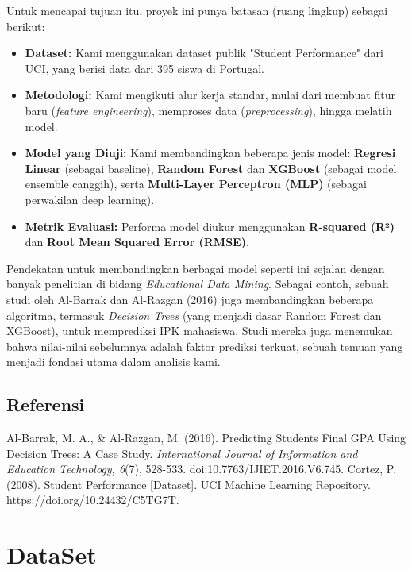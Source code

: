 Untuk mencapai tujuan itu, proyek ini punya batasan (ruang lingkup) sebagai berikut:
\begin{itemize}
    \item \textbf{Dataset:} Kami menggunakan dataset publik "Student Performance" dari UCI, yang berisi data dari 395 siswa di Portugal.
    \item \textbf{Metodologi:} Kami mengikuti alur kerja standar, mulai dari membuat fitur baru (\textit{feature engineering}), memproses data (\textit{preprocessing}), hingga melatih model.
    \item \textbf{Model yang Diuji:} Kami membandingkan beberapa jenis model: \textbf{Regresi Linear} (sebagai baseline), \textbf{Random Forest} dan \textbf{XGBoost} (sebagai model ensemble canggih), serta \textbf{Multi-Layer Perceptron (MLP)} (sebagai perwakilan deep learning).
    \item \textbf{Metrik Evaluasi:} Performa model diukur menggunakan \textbf{R-squared (R²)} dan \textbf{Root Mean Squared Error (RMSE)}.
\end{itemize}

Pendekatan untuk membandingkan berbagai model seperti ini sejalan dengan banyak penelitian di bidang \textit{Educational Data Mining}. Sebagai contoh, sebuah studi oleh Al-Barrak dan Al-Razgan (2016) juga membandingkan beberapa algoritma, termasuk \textit{Decision Trees} (yang menjadi dasar Random Forest dan XGBoost), untuk memprediksi IPK mahasiswa. Studi mereka juga menemukan bahwa nilai-nilai sebelumnya adalah faktor prediksi terkuat, sebuah temuan yang menjadi fondasi utama dalam analisis kami.

\section*{Referensi}
Al-Barrak, M. A., \& Al-Razgan, M. (2016). Predicting Students Final GPA Using Decision Trees: A Case Study. \textit{International Journal of Information and Education Technology, 6}(7), 528-533. doi:10.7763/IJIET.2016.V6.745.
\vspace{0.2cm}
Cortez, P. (2008). Student Performance [Dataset]. UCI Machine Learning Repository. https://doi.org/10.24432/C5TG7T.

\chapter*{DataSet}

